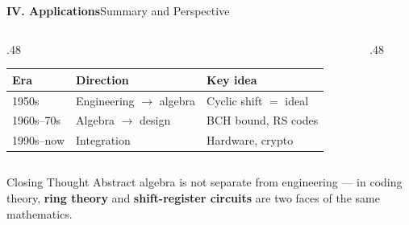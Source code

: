 \begin{frame}{\textbf{IV. Applications}}{Summary and Perspective}

\begin{columns}[T]
  \begin{column}{.48\textwidth}
    \renewcommand{\arraystretch}{1.3}
    \begin{tabular}{@{}p{1.5cm}p{1.8cm}p{2.5cm}@{}}
      \toprule
      \textbf{Era} & \textbf{Direction} & \textbf{Key idea}\\
      \midrule
      1950s & Engineering $\to$ algebra & Cyclic shift $=$ ideal\\[2pt]
      1960s--70s & Algebra $\to$ design & BCH bound, RS codes\\[2pt]
      1990s--now & Integration & Hardware, crypto\\
      \bottomrule
    \end{tabular}
  \end{column}
  \begin{column}{.48\textwidth}
  \end{column}
\end{columns}

\bigskip
\begin{alertblock}{Closing Thought}
\centering\small
Abstract algebra is not separate from engineering — in coding theory, \textbf{ring theory} and \textbf{shift-register circuits} are two faces of the same mathematics.
\end{alertblock}
\end{frame}
